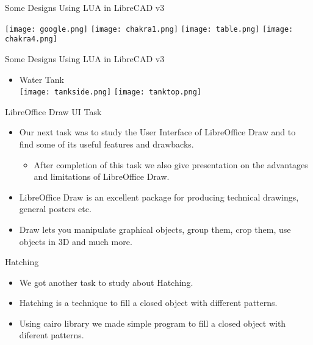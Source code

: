 \begin{frame}[t,fragile]{Some Designs Using LUA in LibreCAD v3}

\texttt{[image: google.png]}
\hspace*{1\baselineskip}
\texttt{[image: chakra1.png]}
\vspace*{1\baselineskip}
\texttt{[image: table.png]}
\hspace*{1\baselineskip}
\texttt{[image: chakra4.png]}
\end{frame}

\begin{frame}[t,fragile]{Some Designs Using LUA in LibreCAD v3}
\begin{itemize}\item Water Tank\\

\texttt{[image: tankside.png]}
\hspace*{1\baselineskip}
\texttt{[image: tanktop.png]}
\end{itemize}
\end{frame}

\begin{frame}[t,fragile]{LibreOffice Draw UI Task}
\begin{itemize}
\item<1-> Our next task was to study the User Interface of LibreOffice Draw and to find some of its useful features and drawbacks.
\begin{itemize}\item<2-> After completion of this task we also give presentation on the advantages and limitations of LibreOffice Draw.
\end{itemize}
\item<3-> LibreOffice Draw is an excellent package for producing technical drawings, general posters etc.
\item<4-> Draw lets you manipulate graphical objects, group them, crop them, use objects in 3D and much more.

\end{itemize}
\end{frame}


\begin{frame}[t,fragile]{Hatching}
\begin{itemize}
\item<1-> We got another task to study about Hatching.
\item<2-> Hatching is a technique to fill a closed object with different patterns. 
\item<3-> Using cairo library we made simple program to fill a closed object with diferent patterns.
  \end{itemize}
\end{frame}
\watermarkon

